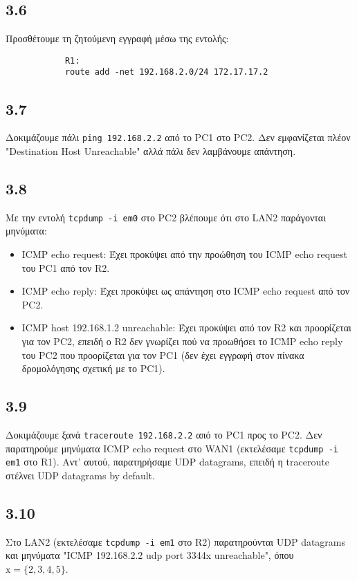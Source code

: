\documentclass[a4paper, 12pt]{article}
\begin{document}
	\subsection*{3.6}
		Προσθέτουμε τη ζητούμενη εγγραφή μέσω της εντολής:
		
		\begin{verbatim}
			R1:
			route add -net 192.168.2.0/24 172.17.17.2
		\end{verbatim}


	\subsection*{3.7}
		Δοκιμάζουμε πάλι \verb|ping 192.168.2.2| από το PC1 στο PC2. Δεν εμφανίζεται πλέον "Destination Host Unreachable" αλλά πάλι δεν λαμβάνουμε απάντηση. 

	\subsection*{3.8}
		Με την εντολή \verb|tcpdump -i em0| στο PC2 βλέπουμε ότι στο LAN2 παράγονται μηνύματα:
		
		\begin{itemize}
			\item ICMP echo request: Έχει προκύψει από την προώθηση του ICMP echo request του PC1 από τον R2.
			\item ICMP echo reply: Έχει προκύψει ως απάντηση στο ICMP echo request από τον PC2.
			\item ICMP host 192.168.1.2 unreachable: Έχει προκύψει από τον R2 και προορίζεται για τον PC2, επειδή ο R2 δεν γνωρίζει πού να προωθήσει το ICMP echo reply του PC2 που προορίζεται για τον PC1 (δεν έχει εγγραφή στον πίνακα δρομολόγησης σχετική με το PC1).
		\end{itemize}

	\subsection*{3.9}
		Δοκιμάζουμε ξανά \verb|traceroute 192.168.2.2| από το PC1 προς το PC2. Δεν παρατηρούμε μηνύματα ICMP echo request στο WAN1 (εκτελέσαμε \verb|tcpdump -i em1| στο R1). Αντ' αυτού, παρατηρήσαμε UDP datagrams, επειδή η traceroute στέλνει UDP datagrams by default.

	\subsection*{3.10}
		Στο LAN2 (εκτελέσαμε \verb|tcpdump -i em1| στο R2) παρατηρούνται UDP datagrams και μηνύματα "ICMP 192.168.2.2 udp port 3344x unreachable", όπου $\text{x}=\{2,3,4,5\}$.
\end{document}
